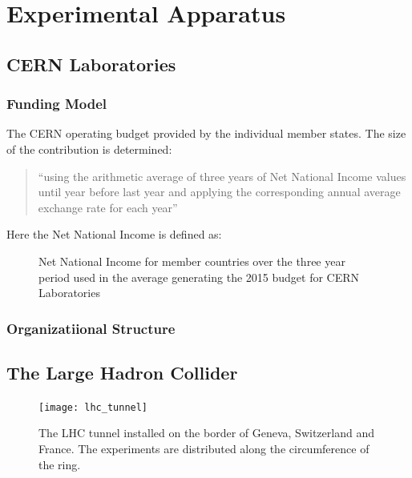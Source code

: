 \chapter{Experimental Apparatus}

\section{CERN Laboratories}

\subsection{Funding Model}

The CERN operating budget provided by the individual member states. The size of the contribution is determined:
\begin{quote}
``using the arithmetic average of three years of Net National
Income values until year before last year and applying the corresponding annual average
exchange rate for each year''
\end{quote}
Here the Net National Income is defined as:


 


\begin{figure}
\begin{center}
\caption{Net National Income for member countries over the three year period used in the average 
generating the 2015 budget for CERN Laboratories}
\end{center}
\end{figure}

\subsection{Organizatiional Structure}



\section{The Large Hadron Collider}

\begin{figure}
\begin{center}
\texttt{[image: lhc\_tunnel]}
\caption{The LHC tunnel installed on the border of Geneva, Switzerland and France. 
The experiments are distributed along the circumference of the ring.}
\end{center}
\end{figure}

